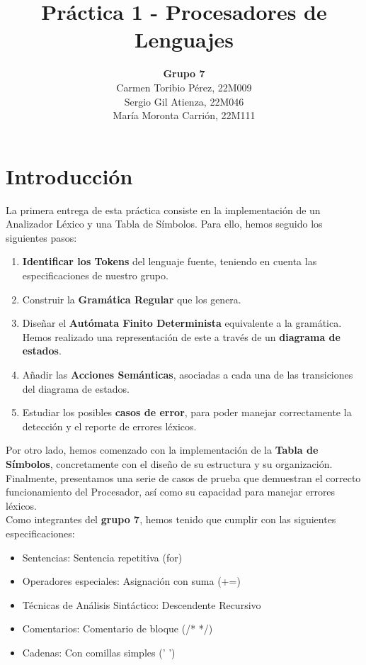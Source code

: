 \documentclass{article}
\title{\textbf{Práctica 1 - Procesadores de Lenguajes}}
\author{\textbf{Grupo 7}\\Carmen Toribio Pérez, 22M009\\Sergio Gil Atienza, 22M046\\María Moronta Carrión, 22M111}
\date{}
\begin{document}
\maketitle

\section{Introducción}

La primera entrega de esta práctica consiste en la implementación de un Analizador Léxico y una Tabla de Símbolos. Para ello, hemos seguido los siguientes pasos: 
\begin{enumerate}
    \item \textbf{Identificar los Tokens} del lenguaje fuente, teniendo en cuenta las especificaciones de nuestro grupo.
    \item Construir la \textbf{Gramática Regular} que los genera.
    \item Diseñar el \textbf{Autómata Finito Determinista} equivalente a la gramática. Hemos realizado una representación de este a través de un \textbf{diagrama de estados}.
    \item Añadir las \textbf{Acciones Semánticas}, asociadas a cada una de las transiciones del diagrama de estados.
    \item Estudiar los posibles \textbf{casos de error}, para poder manejar correctamente la detección y el reporte de errores léxicos. 
\end{enumerate}

Por otro lado, hemos comenzado con la implementación de la \textbf{Tabla de Símbolos}, concretamente con el diseño de su estructura y su organización.\\

Finalmente, presentamos una serie de casos de prueba que demuestran el correcto funcionamiento del Procesador, así como su capacidad para manejar errores léxicos.\\

Como integrantes del \textbf{grupo 7}, hemos tenido que cumplir con las siguientes especificaciones: 
\begin{itemize}[left=2cm]
    \item Sentencias: Sentencia repetitiva (for)
    \item Operadores especiales: Asignación con suma (+=)
    \item Técnicas de Análisis Sintáctico: Descendente Recursivo
    \item Comentarios: Comentario de bloque (/* */)
    \item Cadenas: Con comillas simples (' ')
\end{itemize}
\end{document}
